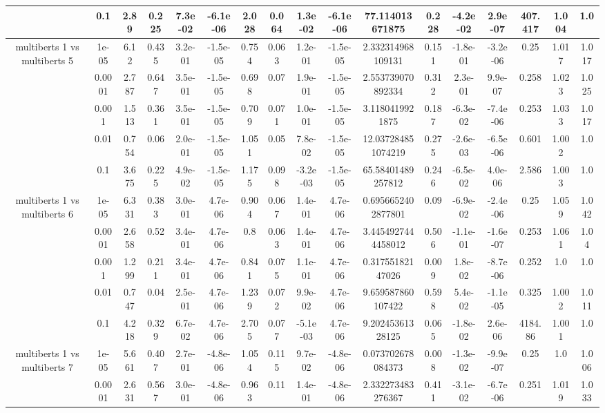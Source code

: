 \begin{tabular}{|c|c|c|c|c|c|c|c|c|c|c|c|c|c|c|c|c|}
 & 0.1 & 2.89 & 0.225 & 7.3e-02 & -6.1e-06 & 2.028 & 0.064 & 1.3e-02 & -6.1e-06 & 77.114013671875 & 0.228 & -4.2e-02 & 2.9e-07 & 407.417 & 1.004 & 1.0 \\
\hline
\multirow{5}{*}{multiberts 1 vs multiberts 5} & 1e-05 & 6.12 & 0.435 & 3.2e-01 & -1.5e-05 & 0.754 & 0.063 & 1.2e-01 & -1.5e-05 & 2.332314968109131 & 0.151 & -1.8e-01 & -3.2e-06 & 0.25 & 1.017 & 1.017 \\
 & 0.0001 & 2.787 & 0.647 & 3.5e-01 & -1.5e-05 & 0.698 & 0.07 & 1.9e-01 & -1.5e-05 & 2.553739070892334 & 0.312 & 2.3e-01 & 9.9e-07 & 0.258 & 1.023 & 1.025 \\
 & 0.001 & 1.513 & 0.361 & 3.5e-01 & -1.5e-05 & 0.709 & 0.071 & 1.0e-01 & -1.5e-05 & 3.1180419921875 & 0.187 & -6.3e-02 & -7.4e-06 & 0.253 & 1.033 & 1.017 \\
 & 0.01 & 0.754 & 0.06 & 2.0e-01 & -1.5e-05 & 1.051 & 0.05 & 7.8e-02 & -1.5e-05 & 12.037284851074219 & 0.275 & -2.6e-03 & -6.5e-06 & 0.601 & 1.002 & 1.0 \\
 & 0.1 & 3.675 & 0.225 & 4.9e-02 & -1.5e-05 & 1.175 & 0.098 & -3.2e-03 & -1.5e-05 & 65.58401489257812 & 0.246 & -6.5e-02 & 4.0e-06 & 2.586 & 1.003 & 1.0 \\
\hline
\multirow{5}{*}{multiberts 1 vs multiberts 6} & 1e-05 & 6.331 & 0.383 & 3.0e-01 & 4.7e-06 & 0.904 & 0.067 & 1.4e-01 & 4.7e-06 & 0.6956652402877801 & 0.09 & -6.9e-02 & -2.4e-06 & 0.25 & 1.059 & 1.042 \\
 & 0.0001 & 2.658 & 0.52 & 3.4e-01 & 4.7e-06 & 0.8 & 0.063 & 1.4e-01 & 4.7e-06 & 3.4454927444458012 & 0.506 & -1.1e-01 & -1.6e-07 & 0.253 & 1.061 & 1.04 \\
 & 0.001 & 1.299 & 0.211 & 3.4e-01 & 4.7e-06 & 0.841 & 0.075 & 1.1e-01 & 4.7e-06 & 0.31755182147026 & 0.009 & 1.8e-02 & -8.7e-06 & 0.252 & 1.0 & 1.0 \\
 & 0.01 & 0.747 & 0.04 & 2.5e-01 & 4.7e-06 & 1.239 & 0.072 & 9.9e-02 & 4.7e-06 & 9.659587860107422 & 0.598 & 5.4e-02 & -1.1e-05 & 0.325 & 1.002 & 1.011 \\
 & 0.1 & 4.218 & 0.329 & 6.7e-02 & 4.7e-06 & 2.705 & 0.077 & -5.1e-03 & 4.7e-06 & 9.20245361328125 & 0.065 & -1.8e-02 & 2.6e-06 & 4184.86 & 1.001 & 1.0 \\
\hline
\multirow{5}{*}{multiberts 1 vs multiberts 7} & 1e-05 & 5.661 & 0.407 & 2.7e-01 & -4.8e-06 & 1.054 & 0.115 & 9.7e-02 & -4.8e-06 & 0.073702678084373 & 0.008 & -1.3e-02 & -9.9e-07 & 0.25 & 1.0 & 1.006 \\
 & 0.0001 & 2.631 & 0.567 & 3.0e-01 & -4.8e-06 & 0.963 & 0.11 & 1.4e-01 & -4.8e-06 & 2.332273483276367 & 0.411 & -3.1e-02 & -6.7e-06 & 0.251 & 1.019 & 1.033 \\

\end{tabular}
